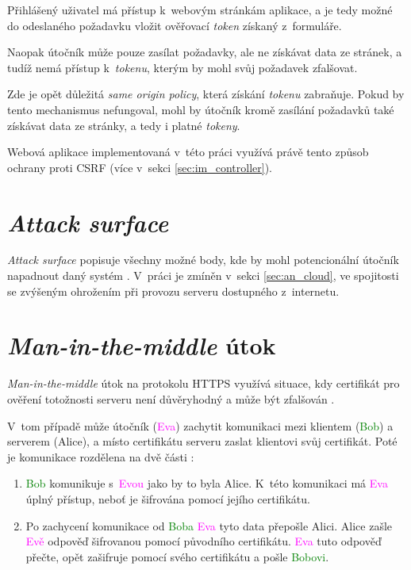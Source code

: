 Přihlášený uživatel má přístup k~webovým stránkám aplikace, a je tedy možné do odeslaného požadavku vložit ověřovací \textit{token} získaný z~formuláře. 

Naopak útočník může pouze zasílat požadavky, ale ne získávat data ze stránek, a tudíž nemá přístup k~\textit{tokenu}, kterým by mohl svůj požadavek zfalšovat.

Zde je opět důležitá \textit{same origin policy}, která získání \textit{tokenu} zabraňuje. Pokud by tento mechanismus nefungoval, mohl by útočník kromě zasílání požadavků také získávat data ze stránky, a tedy i platné \textit{tokeny}.

Webová aplikace implementovaná v~této práci využívá právě tento způsob ochrany proti CSRF (více v~sekci \ref{sec:im_controller}).

\section{\textit{Attack surface}}

\textit{Attack surface} popisuje všechny možné body, kde by mohl potencionální útočník napadnout daný systém \cite{attack_surface_owasp}. V~práci je zmíněn v~sekci \ref{sec:an_cloud}, ve spojitosti se zvýšeným ohrožením při provozu serveru dostupného z~internetu.

\section{\textit{Man-in-the-middle} útok}
\label{sec:th_mitm}

\textit{Man-in-the-middle} útok na protokolu HTTPS využívá situace, kdy certifikát pro ověření totožnosti serveru není důvěryhodný a může být zfalšován \cite{mitm}. 

V~tom případě může útočník (\textcolor{magenta}{Eva}) zachytit komunikaci mezi klientem (\textcolor{green}{Bob}) a serverem (\textcolor{blue2}{Alice}), a místo certifikátu serveru zaslat klientovi svůj certifikát. Poté je komunikace rozdělena na dvě části \cite{mitm}:

\begin{enumerate}
    \item \textcolor{green}{Bob} komunikuje s~\textcolor{magenta}{Evou} jako by to byla \textcolor{blue2}{Alice}. K~této komunikaci má \textcolor{magenta}{Eva} úplný přístup, neboť je šifrována pomocí jejího certifikátu.
    \item Po zachycení komunikace od \textcolor{green}{Boba} \textcolor{magenta}{Eva} tyto data přepošle \textcolor{blue2}{Alici}. \textcolor{blue2}{Alice} zašle \textcolor{magenta}{Evě} odpověď šifrovanou pomocí původního certifikátu. \textcolor{magenta}{Eva} tuto odpověď přečte, opět zašifruje pomocí svého certifikátu a pošle \textcolor{green}{Bobovi}.
\end{enumerate}

